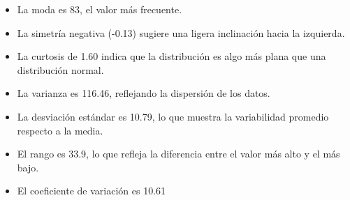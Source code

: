 \documentclass{article}
\begin{document}
\begin{itemize}
\begin{itemize}
\begin{itemize}
                \item La moda es 83, el valor más frecuente.
                \item La simetría negativa (-0.13) sugiere una ligera inclinación hacia la izquierda.
                \item La curtosis de 1.60 indica que la distribución es algo más plana que una distribución normal.
                \item La varianza es 116.46, reflejando la dispersión de los datos.
                \item La desviación estándar es 10.79, lo que muestra la variabilidad promedio respecto a la media.
                \item El rango es 33.9, lo que refleja la diferencia entre el valor más alto y el más bajo.
                \item El coeficiente de variación es 10.61%
            \end{itemize}
    \end{itemize}
    

\end{itemize}
\end{document}
